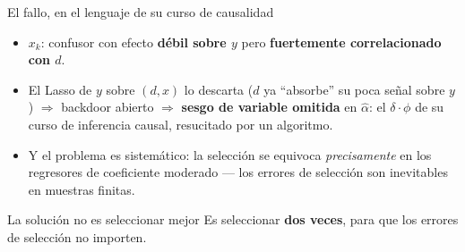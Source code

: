 \documentclass{beamer}
\newcommand{\1}{\mathbb{I}}
\begin{document}
\begin{frame}{El fallo, en el lenguaje de su curso de causalidad}
\small
\begin{center}
\end{center}
\pause

\begin{itemize}\itemsep4pt
  \item $x_k$: confusor con efecto \textbf{débil sobre $y$} pero \textbf{fuertemente correlacionado con $d$}.
  \item El Lasso de $y$ sobre $(d,x)$ lo descarta ($d$ ya ``absorbe'' su poca señal sobre $y$) $\Rightarrow$ backdoor abierto $\Rightarrow$ \textbf{sesgo de variable omitida} en $\hat{\alpha}$: el $\delta \cdot \phi$ de su curso de inferencia causal, resucitado por un algoritmo. \pause
  \item Y el problema es sistemático: la selección se equivoca \emph{precisamente} en los regresores de coeficiente moderado --- los errores de selección son inevitables en muestras finitas.
\end{itemize}
\pause

\begin{block}{La solución no es seleccionar mejor}
Es seleccionar \textbf{dos veces}, para que los errores de selección no importen.
\end{block}
\end{frame}
\end{document}
